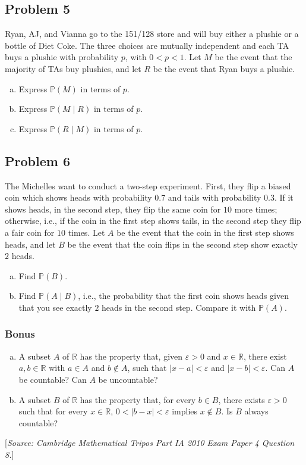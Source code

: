 \newpage\documentclass[11pt,onecolumn,fleqn]{article}
\theoremstyle{definition}
\newcommand{\pr}{\mathbb{P}}
\begin{document}
\subsection*{Problem 5}
Ryan, AJ, and Vianna go to the 151/128 store and will buy either a plushie or a bottle of Diet Coke. The three choices are mutually independent and each TA buys a plushie with probability $p$, with $0<p<1$. Let $M$ be the event that the majority of TAs buy plushies, and let $R$ be the event that Ryan buys a plushie.
\begin{enumerate}[(a)]
    \item Express $\pr(M)$ in terms of $p$.
    \item Express $\pr(M\mid R)$ in terms of $p$.
    \item Express $\pr(R\mid M)$ in terms of $p$. 
\end{enumerate}

\subsection*{Problem 6}
The Michelles want to conduct a two-step experiment.  First, they flip a biased coin which shows heads with probability $0.7$ and tails with probability $0.3$.  If it shows heads, in the second step, they flip the same coin for $10$ more times; otherwise, i.e., if the coin in the first step shows tails, in the second step they flip a fair coin for $10$ times.  Let $A$ be the event that the coin in the first step shows heads, and let $B$ be the event that the coin flips in the second step show exactly $2$ heads.
\begin{enumerate}[(a)]
\item Find $\pr(B)$.
\item Find $\pr(A\mid B)$, i.e., the probability that the first coin shows heads given that you see exactly $2$ heads in the second step.  Compare it with $\pr(A)$.
\end{enumerate}

\subsubsection*{Bonus}
\begin{enumerate}[(a)]
\item A subset $A$ of $\mathbb{R}$ has the property that, given $\varepsilon > 0$ and $x \in \mathbb{R}$, there exist 
$a,b \in \mathbb{R}$ with $a \in A$ and $b \not \in A$, such that $|x-a|<\varepsilon$ and $|x-b|<\varepsilon$. Can $A$ 
be countable? Can $A$ be uncountable?
\item A subset $B$ of $\mathbb{R}$ has the property that, for every $b \in B$, there exists $\varepsilon > 0$
such that for every $x \in \mathbb{R}$, $0<|b-x|<\varepsilon$ implies $x \not \in B$. Is $B$ always countable?
\end{enumerate}

[\textit{Source: Cambridge Mathematical Tripos Part IA 2010 Exam Paper 4 Question 8.}]
\end{document}

